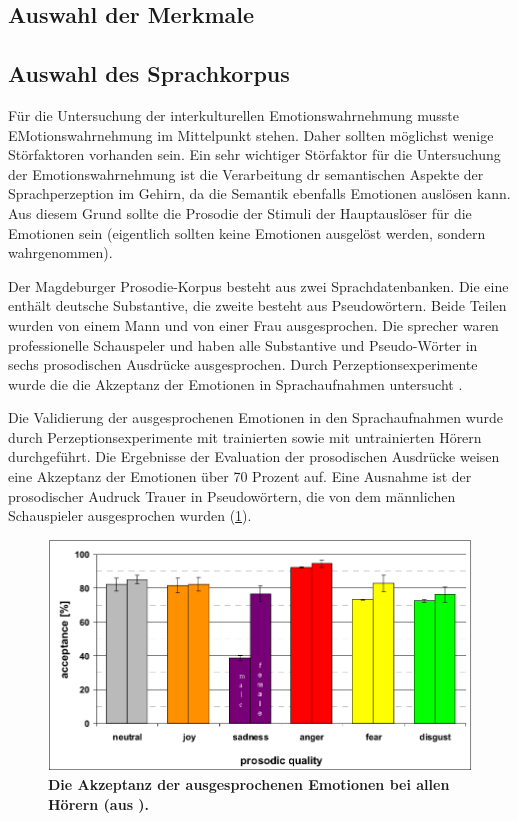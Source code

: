 \documentclass[11pt,a4paper,headsepline,twoside,toc=bibliography]{scrreprt}
\begin{document}
\subsection{Auswahl der Merkmale}

\subsection{Auswahl des Sprachkorpus}
\label{sec:db}

Für die Untersuchung der interkulturellen Emotionswahrnehmung musste EMotionswahrnehmung im Mittelpunkt stehen. Daher sollten möglichst wenige Störfaktoren vorhanden sein. Ein sehr wichtiger Störfaktor für die Untersuchung der Emotionswahrnehmung ist die Verarbeitung dr semantischen Aspekte der Sprachperzeption im Gehirn, da die Semantik ebenfalls Emotionen auslösen kann. Aus diesem Grund sollte die Prosodie der Stimuli der Hauptauslöser für die Emotionen sein (eigentlich sollten keine Emotionen ausgelöst werden, sondern wahrgenommen). 

Der Magdeburger Prosodie-Korpus besteht aus zwei Sprachdatenbanken. Die eine enthält deutsche Substantive, die zweite besteht aus Pseudowörtern. Beide Teilen wurden von einem Mann und von einer Frau ausgesprochen. Die sprecher waren professionelle Schauspeler und haben alle Substantive und Pseudo-Wörter in sechs prosodischen Ausdrücke ausgesprochen. Durch Perzeptionsexperimente wurde die die Akzeptanz der Emotionen in Sprachaufnahmen untersucht \autocite{Wendt2003}.

Die Validierung der ausgesprochenen Emotionen in den Sprachaufnahmen wurde durch Perzeptionsexperimente mit trainierten sowie mit untrainierten Hörern durchgeführt. Die Ergebnisse der Evaluation der prosodischen Ausdrücke weisen eine Akzeptanz der Emotionen über 70 Prozent auf. Eine Ausnahme ist der prosodischer Audruck Trauer in Pseudowörtern, die von dem männlichen Schauspieler ausgesprochen wurden (\ref{fig:wasep_evaluation}).

\begin{figure}
	\centering
	\includegraphics[width=1\linewidth]{pics/wasep_evaluation.png}
	\caption{\textbf{Die Akzeptanz der ausgesprochenen Emotionen bei allen Hörern (aus \cite{Wendt2002}).}}
	\label{fig:wasep_evaluation}
\end{figure}
\end{document}
